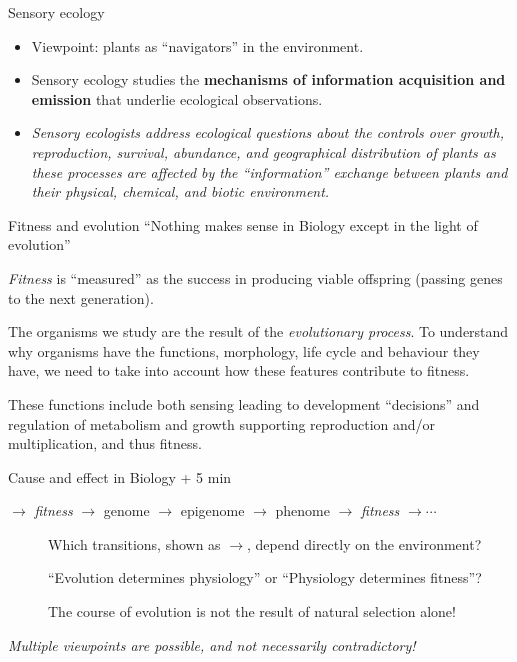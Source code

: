 \documentclass[10pt]{beamer}
\begin{document}
\begin{frame}{Sensory ecology}
    \begin{itemize}
        \item Viewpoint: plants as ``navigators'' in the environment.
        \item Sensory ecology studies the \textbf{mechanisms of information acquisition and emission}
        that underlie ecological observations.
        \item \emph{Sensory ecologists address ecological questions about
        the controls over growth, reproduction, survival, abundance,
        and geographical distribution of plants as these processes
        are affected by the ``information'' exchange between plants and their
        physical, chemical, and biotic environment.}
    \end{itemize}
\end{frame}

\begin{frame}{Fitness and evolution}
    \Attention ``Nothing makes sense in Biology except in the light of evolution''

    \vspace{0.5ex}
       \emph{Fitness} is ``measured'' as the success in producing viable offspring (passing genes to the next generation).

       The organisms we study are the result of the \emph{evolutionary process}. To understand why organisms have the functions, morphology, life cycle and behaviour they have, we need to take into account how these features contribute to fitness.

       These functions include both sensing leading to development ``decisions'' and regulation of metabolism and growth supporting reproduction and/or multiplication, and thus fitness.
\end{frame}

\begin{frame}{Cause and effect in Biology  + 5 min}

\begin{centering}
$\to$ \emph{fitness} $\to$ genome $\to$  epigenome $\to$ phenome $\to$ \emph{fitness} $\to \cdots$
\vspace{3ex}
\end{centering}

\begin{description}
  \item[\DiscussionI] Which transitions, shown as $\to$, depend directly on the environment?
  \item[\DiscussionI] ``Evolution determines physiology'' or ``Physiology determines fitness''?
  \item[\Attention] The course of evolution is not the result of natural selection alone!
\end{description}
\pause
\Attention \emph{Multiple viewpoints are possible, and not necessarily contradictory!}
\end{frame}
\end{document}
